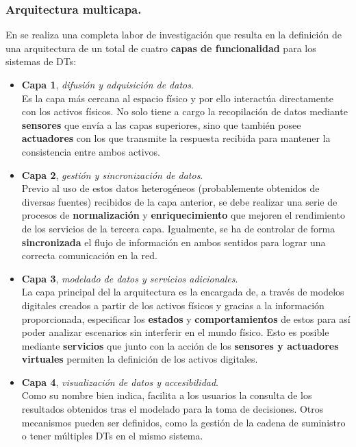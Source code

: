 \documentclass[../main.tex]{subfiles}
\begin{document}
\newpage
\subsubsection{Arquitectura multicapa.}\label{Arquitectura multicapa}
En \cite{ThreatsDT} se realiza una completa labor de investigación que resulta en la definición de una arquitectura de un total de cuatro \textbf{capas de funcionalidad} para los sistemas de \acrshort{DT}s:
\\

\begin{itemize}
    \item \textbf{Capa 1}, \textit{difusión y adquisición de datos}. 
    \\ Es la capa más cercana al espacio físico y por ello interactúa directamente con los activos físicos. No solo tiene a cargo la recopilación de datos mediante \textbf{sensores} que envía a las capas superiores, sino que también posee \textbf{actuadores} con los que transmite la respuesta recibida para mantener la consistencia entre ambos activos.
    \\
    
    \item \textbf{Capa 2}, \textit{gestión y sincronización de datos}.
     \\ Previo al uso de estos datos heterogéneos (probablemente obtenidos de diversas fuentes) recibidos de la capa anterior, se debe realizar una serie de procesos de \textbf{normalización} y \textbf{enriquecimiento} que mejoren el rendimiento de los servicios de la tercera capa. Igualmente, se ha de controlar de forma \textbf{sincronizada} el flujo de información en ambos sentidos para lograr una correcta comunicación en la red. 
     \\
    
    \item \textbf{Capa 3}, \textit{modelado de datos y servicios adicionales}. 
    \\ La capa principal del la arquitectura es la encargada de, a través de modelos digitales creados a partir de los activos físicos y gracias a la información proporcionada, especificar los \textbf{estados} y \textbf{comportamientos} de estos para así poder analizar escenarios sin interferir en el mundo físico. Esto es posible mediante \textbf{servicios} que junto con la acción de los \textbf{sensores y actuadores virtuales} permiten la definición de los activos digitales.
    \\ 

    \item \textbf{Capa 4}, \textit{visualización de datos y accesibilidad}. 
    \\ Como su nombre bien indica, facilita a los usuarios la consulta de los resultados obtenidos tras el modelado para la toma de decisiones. Otros mecanismos pueden ser definidos, como la gestión de la cadena de suministro o tener múltiples \acrshort{DT}s en el mismo sistema.
    \\
\end{itemize}
\end{document}
